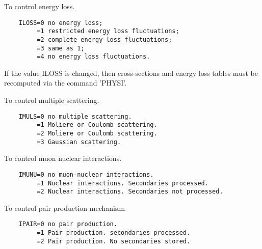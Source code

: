    \par
To control energy loss.  
\begin{verbatim}
    ILOSS=0 no energy loss;
         =1 restricted energy loss fluctuations;
         =2 complete energy loss fluctuations;
         =3 same as 1;
         =4 no energy loss fluctuations.
\end{verbatim}
   \par
If the value ILOSS is changed, then cross-sections and energy loss tables 
   must be recomputed via the command 'PHYSI'.  

\ENDCMD


\BEGARG
{}
\ENDARG
{}
\ENDOPT

   \par
To control multiple scattering.  
\begin{verbatim}
    IMULS=0 no multiple scattering.
         =1 Moliere or Coulomb scattering.
         =2 Moliere or Coulomb scattering.
         =3 Gaussian scattering.
\end{verbatim}

\ENDCMD


\BEGARG
{}
\ENDARG
{}
\ENDOPT

   \par
To control muon nuclear interactions.  
\begin{verbatim}
    IMUNU=0 no muon-nuclear interactions.
         =1 Nuclear interactions. Secondaries processed.
         =2 Nuclear interactions. Secondaries not processed.
\end{verbatim}

\ENDCMD


\BEGARG
{}
\ENDARG
{}
\ENDOPT

   \par
To control pair production mechanism.  
\begin{verbatim}
    IPAIR=0 no pair production.
         =1 Pair production. secondaries processed.
         =2 Pair production. No secondaries stored.
\end{verbatim}

